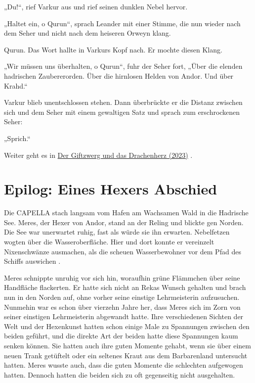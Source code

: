 \documentclass[10pt, a4paper, oneside]{book}
\newcommand{\hypref}[1]{%
    \hyperref[#1]{#1}%
}
\begin{document}
„Du!“, rief Varkur aus und rief seinen dunklen Nebel hervor.

„Haltet ein, o Qurun“, sprach Leander mit einer Stimme, die nun wieder nach dem Seher und nicht nach dem heiseren Orweyn klang.

Qurun. Das Wort hallte in Varkurs Kopf nach. Er mochte diesen Klang.

„Wir müssen uns überhalten, o Qurun“, fuhr der Seher fort, „Über die elenden hadrischen Zaubererorden. Über die hirnlosen Helden von Andor. Und über Krahd.“

Varkur blieb unentschlossen stehen. Dann überbrückte er die Distanz zwischen sich und dem Seher mit einem gewaltigen Satz und sprach zum erschrockenen Seher:

„Sprich.“

\begin{center}
    Weiter geht es in \hypref{Der Giftzwerg und das Drachenherz (2023)}.
\end{center}












\newpage
\section{Epilog: Eines Hexers Abschied}



Die CAPELLA stach langsam vom Hafen am Wachsamen Wald in die Hadrische See. Meres, der Hexer von Andor, stand an der Reling und blickte gen Norden. Die See war unerwartet ruhig, fast als würde sie ihn erwarten. Nebelfetzen wogten über die Wasseroberfläche. Hier und dort konnte er vereinzelt Nixenschwänze ausmachen, als die scheuen Wasserbewohner vor dem Pfad des Schiffs auswichen .

Meres schnippte unruhig vor sich hin, woraufhin grüne Flämmchen über seine Handfläche flackerten. Er hatte sich nicht an Rekas Wunsch gehalten und brach nun in den Norden auf, ohne vorher seine einstige Lehrmeisterin aufzusuchen. Nunmehin war es schon über vierzehn Jahre her, dass Meres sich im Zorn von seiner einstigen Lehrmeisterin abgewandt hatte. Ihre verschiedenen Sichten der Welt und der Hexenkunst hatten schon einige Male zu Spannungen zwischen den beiden geführt, und die direkte Art der beiden hatte diese Spannungen kaum senken können. Sie hatten auch ihre guten Momente gehabt, wenn sie über einem neuen Trank getüftelt oder ein seltenes Kraut aus dem Barbarenland untersucht hatten. Meres wusste auch, dass die guten Momente die schlechten aufgewogen hatten. Dennoch hatten die beiden sich zu oft gegenseitig nicht ausgehalten.
\end{document}

